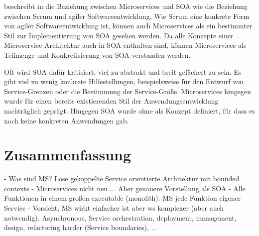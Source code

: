 \citeauthor{newman2015building} beschreibt in \cite{newman2015building} die Beziehung zwischen Microservices und SOA wie die Beziehung zwischen Scrum und agiler Softwareentwicklung. Wie Scrum eine konkrete Form von agiler Softwareentwicklung ist, können auch Microservices als ein bestimmter Stil zur Implementierung von SOA gesehen werden. Da alle Konzepte einer Microservice Architektur auch in SOA enthalten sind, können Microservices als Teilmenge und Konkretisierung von SOA verstanden werden.

Oft wird SOA dafür kritisiert, viel zu abstrakt und breit gefächert zu sein. Es gibt viel zu wenig konkrete Hilfestellungen, beispielsweise für den Entwurf von Service-Grenzen oder die Bestimmung der Service-Größe. Microservices hingegen wurde für einen bereits existierenden Stil der Anwendungsentwicklung nachträglich geprägt. Hingegen SOA wurde ohne als Konzept definiert, für dass es noch keine konkreten Anwendungen gab.

\section{Zusammenfassung}

- Was sind MS? Lose gekoppelte Service orientierte Architektur mit bounded contexts
- Microservices nicht neu ... Aber genauere Vorstellung als SOA
- Alle Funktionen in einem großen executable (monolith). MS jede Funktion eigener Service
- Vorsicht, MS wirkt einfacher ist aber ws komplexer (aber auch notwendig). Asynchronous, Service orchestration, deployment, management, design, refactoring harder (Service boundaries), ...